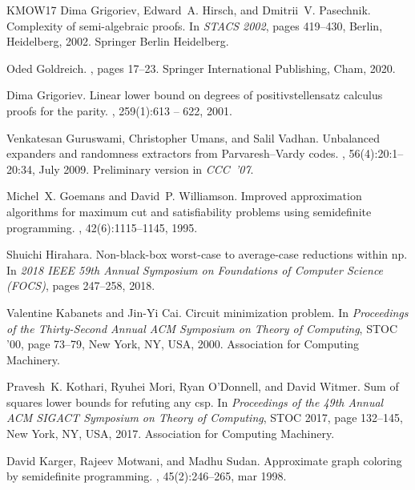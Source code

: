 \documentclass[10pt,a4paper]{article}
\theoremstyle{plain}
\theoremstyle{remark}
\theoremstyle{definition}
\begin{document}
\begin{thebibliography}{KMOW17}
Dima Grigoriev, Edward~A. Hirsch, and Dmitrii~V. Pasechnik.
\newblock Complexity of semi-algebraic proofs.
\newblock In {\em STACS 2002}, pages 419--430, Berlin, Heidelberg, 2002.
  Springer Berlin Heidelberg.

Oded Goldreich.
,
  pages 17--23.
\newblock Springer International Publishing, Cham, 2020.

Dima Grigoriev.
\newblock Linear lower bound on degrees of positivstellensatz calculus proofs
  for the parity.
, 259(1):613 -- 622, 2001.

Venkatesan Guruswami, Christopher Umans, and Salil Vadhan.
\newblock Unbalanced expanders and randomness extractors from
  {P}arvaresh--{V}ardy codes.
, 56(4):20:1\nobreakdash--20:34, July 2009.
\newblock Preliminary version in \emph{CCC~'07}.

Michel~X. Goemans and David~P. Williamson.
\newblock Improved approximation algorithms for maximum cut and satisfiability
  problems using semidefinite programming.
, 42(6):1115--1145, 1995.

Shuichi Hirahara.
\newblock Non-black-box worst-case to average-case reductions within np.
\newblock In {\em 2018 IEEE 59th Annual Symposium on Foundations of Computer
  Science (FOCS)}, pages 247--258, 2018.

Valentine Kabanets and Jin-Yi Cai.
\newblock Circuit minimization problem.
\newblock In {\em Proceedings of the Thirty-Second Annual ACM Symposium on
  Theory of Computing}, STOC '00, page 73–79, New York, NY, USA, 2000.
  Association for Computing Machinery.

Pravesh~K. Kothari, Ryuhei Mori, Ryan O’Donnell, and David Witmer.
\newblock Sum of squares lower bounds for refuting any csp.
\newblock In {\em Proceedings of the 49th Annual ACM SIGACT Symposium on Theory
  of Computing}, STOC 2017, page 132–145, New York, NY, USA, 2017.
  Association for Computing Machinery.

David Karger, Rajeev Motwani, and Madhu Sudan.
\newblock Approximate graph coloring by semidefinite programming.
, 45(2):246–265, mar 1998.


\end{thebibliography}
\end{document}
